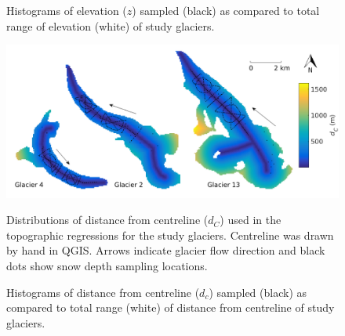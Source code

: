 \documentclass{sfuthesis}
\newcommand{\topomap}{Arrows indicate glacier flow direction and black dots show snow depth sampling locations. }
\begin{document}
\begin{figure}[H]
	\caption{Histograms of elevation ($z$) sampled (black) as compared to total range of elevation (white) of study glaciers.}
	\label{sampledRange:elev}
\end{figure}

\begin{figure}[H]
	\centering
	\includegraphics[width=\textwidth]{Map_centreD.png}\\
	\caption{Distributions of distance from centreline ($d_C$) used in the topographic regressions for the study glaciers. Centreline was drawn by hand in QGIS. \topomap}
	\label{map:centreD}
\end{figure}

\begin{figure}[H]
	\caption{Histograms of distance from centreline ($d_c$) sampled (black) as compared to total range (white) of distance from centreline of study glaciers.}
	\label{sampledRange:centreD}
\end{figure}
\end{document}
